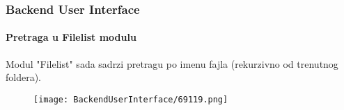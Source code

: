 \begin{frame}[fragile]
	\frametitle{Backend User Interface}
	\framesubtitle{Pretraga u Filelist modulu}

	Modul "Filelist" sada sadrzi pretragu po imenu fajla (rekurzivno od trenutnog foldera).

	\begin{figure}
		\texttt{[image: BackendUserInterface/69119.png]}
	\end{figure}

\end{frame}

